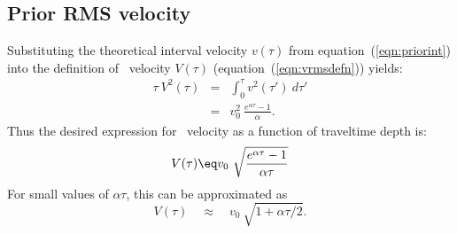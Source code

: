 \subsection{Prior RMS velocity}
Substituting the theoretical interval velocity $v(\tau)$
from equation~(\ref{eqn:priorint})
into the definition of
\RMS\ velocity $V(\tau)$
(equation~(\ref{eqn:vrmsdefn}))
yields:
\begin{eqnarray}
\tau \ V^2(\tau) &=& \int_{0}^{\tau} v^2(\tau') \ d \tau'
\\
               &=& v_0^2 \ \frac {e^{\alpha \tau} - 1} {\alpha} .
\end{eqnarray}
Thus the desired expression for \RMS\ velocity
as a function of traveltime depth is:
\begin{equation}
V(\tau) \eq v_0 \ 
        \sqrt{
        \frac{e^{\alpha \tau} - 1 }{\alpha \tau}
        }
\label{eqn:Vrms}
\end{equation}
For small values of $\alpha \tau$,
this can be approximated as
\begin{equation}
V(\tau) \quad\approx \quad v_0\ \sqrt{1 + \alpha \tau / 2}  .
\end{equation}











































                                                                        
